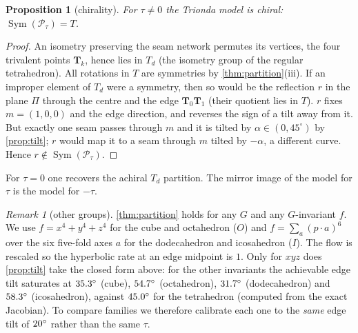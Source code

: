 \documentclass[11pt]{article}
\newtheorem{proposition}[theorem]{Proposition}
\theoremstyle{definition}
\theoremstyle{remark}
\newtheorem{remark}[theorem]{Remark}
\DeclareMathOperator{\Sym}{Sym}
\begin{document}
\begin{proposition}[chirality]\label{prop:chiral}
For $\tau\ne0$ the Trionda model is chiral: $\Sym(\mathcal P_\tau)=T$.
\end{proposition}
\begin{proof}
An isometry preserving the seam network permutes its vertices, the four trivalent points $\mathbf T_k$, hence lies in $T_d$ (the isometry group of the regular tetrahedron).
All rotations in $T$ are symmetries by \cref{thm:partition}(iii). If an improper element of $T_d$ were a symmetry, then so would be the reflection $r$ in the plane $\Pi$
through the centre and the edge $\mathbf T_0\mathbf T_1$ (their quotient lies in $T$). $r$ fixes $m=(1,0,0)$ and the edge direction, and reverses the sign of a tilt away from it.
But exactly one seam passes through $m$ and it is tilted by $\alpha\in(0,45^\circ)$ by \cref{prop:tilt}; $r$ would map it to a seam through $m$ tilted by $-\alpha$,
a different curve. Hence $r\notin\Sym(\mathcal P_\tau)$.
\end{proof}
For $\tau=0$ one recovers the achiral $T_d$ partition. The mirror image of the model for $\tau$ is the model for $-\tau$.

\begin{remark}[other groups]\label{rem:families}
\cref{thm:partition} holds for any $G$ and any $G$-invariant $f$. We use $f=x^4+y^4+z^4$ for the cube and octahedron ($O$) and $f=\sum_{a}(p\cdot a)^6$ over the six five-fold axes
$a$ for the dodecahedron and icosahedron ($I$). The flow is rescaled so the hyperbolic rate at an edge midpoint is $1$.
Only for $xyz$ does \cref{prop:tilt} take the closed form above: for the other invariants the achievable edge tilt saturates at $35.3^\circ$ (cube),
$54.7^\circ$ (octahedron), $31.7^\circ$ (dodecahedron) and $58.3^\circ$ (icosahedron), against $45.0^\circ$ for the tetrahedron
(computed from the exact Jacobian). To compare families we therefore calibrate each one to the \emph{same} edge tilt of $20^\circ$ rather than the same $\tau$.
\end{remark}

\end{document}
